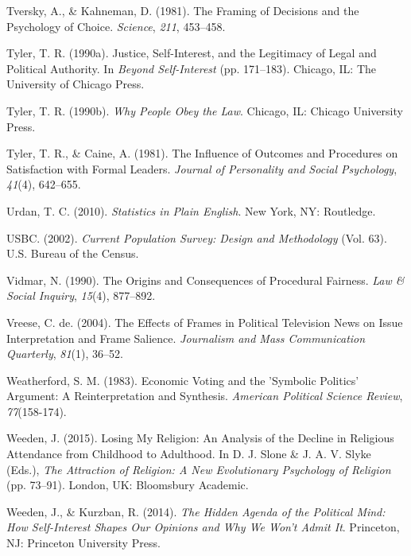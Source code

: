 \documentclass[12pt,econ]{sources/authesis}
\begin{document}
\leavevmode\hypertarget{ref-tversky_framing_1981}{}%
Tversky, A., \& Kahneman, D. (1981). The Framing of Decisions and the Psychology of Choice. \emph{Science}, \emph{211}, 453--458.

\leavevmode\hypertarget{ref-tyler_justice_1990}{}%
Tyler, T. R. (1990a). Justice, Self-Interest, and the Legitimacy of Legal and Political Authority. In \emph{Beyond Self-Interest} (pp. 171--183). Chicago, IL: The University of Chicago Press.

\leavevmode\hypertarget{ref-tyler_1990_people}{}%
Tyler, T. R. (1990b). \emph{Why People Obey the Law}. Chicago, IL: Chicago University Press.

\leavevmode\hypertarget{ref-tyler_1981_influence}{}%
Tyler, T. R., \& Caine, A. (1981). The Influence of Outcomes and Procedures on Satisfaction with Formal Leaders. \emph{Journal of Personality and Social Psychology}, \emph{41}(4), 642--655.

\leavevmode\hypertarget{ref-urdan_statistics_2010}{}%
Urdan, T. C. (2010). \emph{Statistics in Plain English}. New York, NY: Routledge.

\leavevmode\hypertarget{ref-census_2002_current}{}%
USBC. (2002). \emph{Current Population Survey: Design and Methodology} (Vol. 63). U.S. Bureau of the Census.

\leavevmode\hypertarget{ref-vidmar_1990_origins}{}%
Vidmar, N. (1990). The Origins and Consequences of Procedural Fairness. \emph{Law \& Social Inquiry}, \emph{15}(4), 877--892.

\leavevmode\hypertarget{ref-vreese_effects_2004}{}%
Vreese, C. de. (2004). The Effects of Frames in Political Television News on Issue Interpretation and Frame Salience. \emph{Journalism and Mass Communication Quarterly}, \emph{81}(1), 36--52.

\leavevmode\hypertarget{ref-weatherford_economic_1983}{}%
Weatherford, S. M. (1983). Economic Voting and the 'Symbolic Politics' Argument: A Reinterpretation and Synthesis. \emph{American Political Science Review}, \emph{77}(158-174).

\leavevmode\hypertarget{ref-weeden_2015_losing}{}%
Weeden, J. (2015). Losing My Religion: An Analysis of the Decline in Religious Attendance from Childhood to Adulthood. In D. J. Slone \& J. A. V. Slyke (Eds.), \emph{The Attraction of Religion: A New Evolutionary Psychology of Religion} (pp. 73--91). London, UK: Bloomsbury Academic.

\leavevmode\hypertarget{ref-weeden_2014_hidden}{}%
Weeden, J., \& Kurzban, R. (2014). \emph{The Hidden Agenda of the Political Mind: How Self-Interest Shapes Our Opinions and Why We Won't Admit It}. Princeton, NJ: Princeton University Press.
\end{document}
